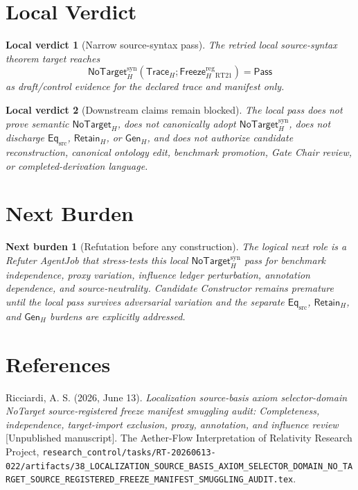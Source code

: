 \documentclass[11pt]{article}
\newcommand{\GenH}{\mathsf{Gen}_{H}}
\newcommand{\EqSrc}{\mathsf{Eq}_{\mathrm{src}}}
\newcommand{\RetainH}{\mathsf{Retain}_{H}}
\newcommand{\NoTargetH}{\mathsf{NoTarget}_{H}}
\newcommand{\NoTargetSyn}{\mathsf{NoTarget}_{H}^{\mathrm{syn}}}
\newcommand{\TraceH}{\mathsf{Trace}_{H}}
\newcommand{\FreezeH}{\mathsf{Freeze}_{H}}
\newcommand{\Pass}{\mathsf{Pass}}
\newtheorem{localverdict}{Local verdict}
\newtheorem{nextburden}{Next burden}
\begin{document}
\section{Local Verdict}

\begin{localverdict}[Narrow source-syntax pass]
The retried local source-syntax theorem target reaches
\[
    \NoTargetSyn(\TraceH;\FreezeH^{\mathrm{reg}}_{\mathrm{RT21}})
    = \Pass
\]
as draft/control evidence for the declared trace and manifest only.
\end{localverdict}

\begin{localverdict}[Downstream claims remain blocked]
The local pass does not prove semantic \(\NoTargetH\), does not canonically
adopt \(\NoTargetSyn\), does not discharge \(\EqSrc\), \(\RetainH\), or
\(\GenH\), and does not authorize candidate reconstruction, canonical
ontology edit, benchmark promotion, Gate Chair review, or
completed-derivation language.
\end{localverdict}

\section{Next Burden}

\begin{nextburden}[Refutation before any construction]
The logical next role is a Refuter AgentJob that stress-tests this local
\(\NoTargetSyn\) pass for benchmark independence, proxy variation, influence
ledger perturbation, annotation dependence, and source-neutrality. Candidate
Constructor remains premature until the local pass survives adversarial
variation and the separate \(\EqSrc\), \(\RetainH\), and \(\GenH\) burdens
are explicitly addressed.
\end{nextburden}

\section*{References}

Ricciardi, A. S. (2026, June 13). \emph{Localization source-basis axiom
selector-domain NoTarget source-registered freeze manifest smuggling audit:
Completeness, independence, target-import exclusion, proxy, annotation, and
influence review} [Unpublished manuscript]. The Aether-Flow Interpretation
of Relativity Research Project,
\texttt{research\_control/tasks/RT-20260613-022/artifacts/38\_LOCALIZATION\_SOURCE\_BASIS\_AXIOM\_SELECTOR\_DOMAIN\_NO\_TARGET\_SOURCE\_REGISTERED\_FREEZE\_MANIFEST\_SMUGGLING\_AUDIT.tex}.
\end{document}
